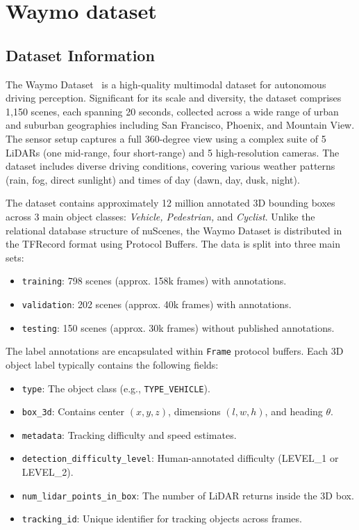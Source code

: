 \section{Waymo dataset}

\subsection{Dataset Information}
The Waymo Dataset~\cite{waymo} is a high-quality multimodal dataset for autonomous driving perception. Significant for its scale and diversity, the dataset comprises 1,150 scenes, each spanning 20 seconds, collected across a wide range of urban and suburban geographies including San Francisco, Phoenix, and Mountain View. The sensor setup captures a full 360-degree view using a complex suite of 5 LiDARs (one mid-range, four short-range) and 5 high-resolution cameras. The dataset includes diverse driving conditions, covering various weather patterns (rain, fog, direct sunlight) and times of day (dawn, day, dusk, night).

The dataset contains approximately 12 million annotated 3D bounding boxes across 3 main object classes: \textit{Vehicle, Pedestrian,} and \textit{Cyclist}. Unlike the relational database structure of nuScenes, the Waymo Dataset is distributed in the TFRecord format using Protocol Buffers. The data is split into three main sets:

\begin{itemize}
    \item \texttt{training}: 798 scenes (approx. 158k frames) with annotations.
    \item \texttt{validation}: 202 scenes (approx. 40k frames) with annotations.
    \item \texttt{testing}: 150 scenes (approx. 30k frames) without published annotations.
\end{itemize}



The label annotations are encapsulated within \texttt{Frame} protocol buffers. Each 3D object label typically contains the following fields:

\begin{itemize}
    \item \texttt{type}: The object class (e.g., \texttt{TYPE\_VEHICLE}).
    \item \texttt{box\_3d}: Contains center $(x, y, z)$, dimensions $(l, w, h)$, and heading $\theta$.
    \item \texttt{metadata}: Tracking difficulty and speed estimates.
    \item \texttt{detection\_difficulty\_level}: Human-annotated difficulty (LEVEL\_1 or LEVEL\_2).
    \item \texttt{num\_lidar\_points\_in\_box}: The number of LiDAR returns inside the 3D box.
    \item \texttt{tracking\_id}: Unique identifier for tracking objects across frames.
\end{itemize}

